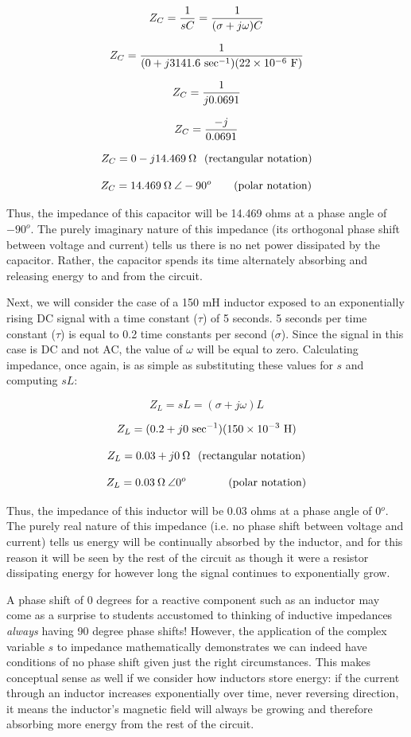 $$Z_C = {1 \over sC} = {1 \over (\sigma + j \omega) C}$$

$$Z_C = {1 \over (0 + j 3141.6 \hbox{ sec}^{-1}) (22 \times 10^{-6} \hbox{ F})}$$

$$Z_C = {1 \over j 0.0691}$$

$$Z_C = {-j \over 0.0691}$$

$$Z_C = 0 - j 14.469 \> \Omega \hbox{\hskip 7pt (rectangular notation)}$$

$$Z_C = 14.469 \> \Omega \> \angle -90^{o} \hbox{\hskip 20pt (polar notation)}$$

Thus, the impedance of this capacitor will be 14.469 ohms at a phase angle of $-90^{o}$.  The purely imaginary nature of this impedance (its orthogonal phase shift between voltage and current) tells us there is no net power dissipated by the capacitor.  Rather, the capacitor spends its time alternately absorbing and releasing energy to and from the circuit.

\vskip 10pt

\filbreak

Next, we will consider the case of a 150 mH inductor exposed to an exponentially rising DC signal with a time constant ($\tau$) of 5 seconds.  5 seconds per time constant ($\tau$) is equal to 0.2 time constants per second ($\sigma$).  Since the signal in this case is DC and not AC, the value of $\omega$ will be equal to zero.  Calculating impedance, once again, is as simple as substituting these values for $s$ and computing $sL$:

$$Z_L = sL = (\sigma + j \omega)L$$

$$Z_L = (0.2 + j 0 \hbox{ sec}^{-1})(150 \times 10^{-3} \hbox{ H})$$

$$Z_L = 0.03 + j 0 \> \Omega \hbox{\hskip 7pt (rectangular notation)}$$

$$Z_L = 0.03 \> \Omega \> \angle 0^{o} \hbox{\hskip 38pt (polar notation)}$$

Thus, the impedance of this inductor will be 0.03 ohms at a phase angle of 0$^{o}$.  The purely real nature of this impedance (i.e. no phase shift between voltage and current) tells us energy will be continually absorbed by the inductor, and for this reason it will be seen by the rest of the circuit as though it were a resistor dissipating energy for however long the signal continues to exponentially grow.

\vskip 10pt

A phase shift of 0 degrees for a reactive component such as an inductor may come as a surprise to students accustomed to thinking of inductive impedances \textit{always} having 90 degree phase shifts!  However, the application of the complex variable $s$ to impedance mathematically demonstrates we can indeed have conditions of no phase shift given just the right circumstances.  This makes conceptual sense as well if we consider how inductors store energy: if the current through an inductor increases exponentially over time, never reversing direction, it means the inductor's magnetic field will always be growing and therefore absorbing more energy from the rest of the circuit.

